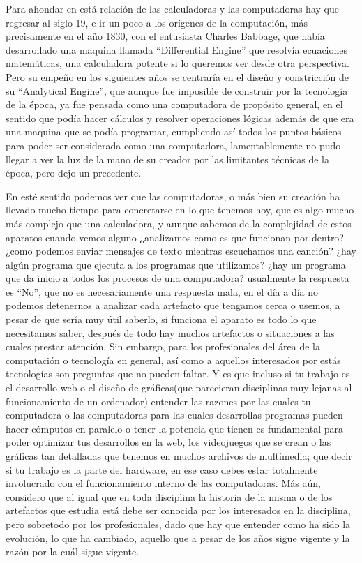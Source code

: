 \documentclass[letterpaper,12pt,oneside]{book}
\begin{document}
	Para ahondar en está relación de las calculadoras y las computadoras hay que regresar al siglo 19, e ir un poco a los orígenes de la computación,
    más precisamente en el año 1830, con el entusiasta Charles Babbage, que había desarrollado una maquina llamada ``Differential Engine''
	que resolvía ecuaciones matemáticas, una calculadora potente si lo queremos ver desde otra perspectiva. Pero su empeño en los siguientes años 
	se centraría en el diseño y constricción
	de su ``Analytical Engine'', que aunque fue imposible de construir por la tecnología de la época, ya fue pensada como una computadora
	de propósito general, en el sentido que podía hacer cálculos y resolver operaciones lógicas además de que era una maquina que se podía programar,
	cumpliendo así todos los puntos básicos para poder ser considerada como una computadora, lamentablemente no pudo llegar a ver la luz de la mano
	de su creador por las limitantes técnicas de la época, pero dejo un precedente.
	
	En esté sentido podemos ver que las computadoras, o más bien su creación ha llevado mucho tiempo para concretarse en lo que tenemos hoy, que es algo mucho
	más complejo que una calculadora, y aunque sabemos de la complejidad de estos aparatos cuando vemos alguno ¿analizamos como es que funcionan por dentro? ¿como podemos enviar mensajes de texto mientras escuchamos una canción? ¿hay algún programa que ejecuta a los programas que utilizamos? ¿hay un programa que da inicio a todos los procesos de una computadora?
	usualmente la respuesta es ``No'', que no es necesariamente una respuesta mala, en el día a día no podemos detenernos a analizar cada artefacto que tengamos cerca o usemos, a pesar de que sería muy útil saberlo,
	si funciona el aparato es todo lo que necesitamos saber, después de todo hay muchos artefactos o situaciones
	a las cuales prestar atención. Sin embargo, para los profesionales del área de la computación o tecnología en general, así como a aquellos interesados
	por estás tecnologías son preguntas que no pueden faltar. Y es que incluso si tu trabajo es el desarrollo web o
	el diseño de gráficas(que parecieran disciplinas muy lejanas al funcionamiento de un ordenador) entender las razones por las cuales tu computadora o las computadoras para las cuales desarrollas programas pueden hacer cómputos
	en paralelo o tener la potencia que tienen es fundamental para poder optimizar tus desarrollos en la web, los videojuegos que se crean o las gráficas tan detalladas que tenemos en muchos archivos de multimedia; que decir si tu trabajo es la parte del hardware, en ese
	caso debes estar totalmente involucrado con el funcionamiento interno de las computadoras.
	Más aún, considero que al igual que en toda disciplina la historia de la misma o de los artefactos que estudia está debe ser conocida por
	los interesados en la disciplina, pero sobretodo por los profesionales, dado que hay que entender como ha sido la evolución, lo que ha cambiado,
	aquello que a pesar de los años sigue vigente y la razón por la cuál sigue vigente.
	
\end{document}
